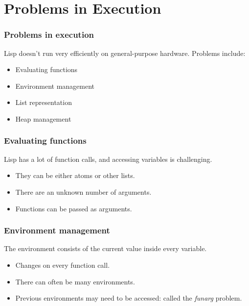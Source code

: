 \documentclass{beamer}
\begin{document}
\section{Problems in Execution}

\begin{frame}
	\frametitle{Problems in execution}
	Lisp doesn't run very efficiently on general-purpose hardware. Problems include:
	\newline
	\begin{itemize}
		\item Evaluating functions
		\newline
		\item Environment management
		\newline
		\item List representation
		\newline
		\item Heap management
	\end{itemize}
	
\end{frame}

\begin{frame}
	\frametitle{Evaluating functions}
	Lisp has a lot of function calls, and accessing variables is challenging.
	\newline
	\begin{itemize}
		\item They can be either atoms or other lists.
		\newline
		\item There are an unknown number of arguments.
		\newline
		\item Functions can be passed as arguments.
	\end{itemize}
\end{frame}

\begin{frame}
	\frametitle{Environment management}
	The environment consists of the current value inside every variable.
	\newline
	\begin{itemize}
		\item Changes on every function call.
		\newline
		\item There can often be many environments.
		\newline
		\item Previous environments may need to be accessed: called the \textit{funarg} problem.
	\end{itemize}
	
\end{frame}
\end{document}
